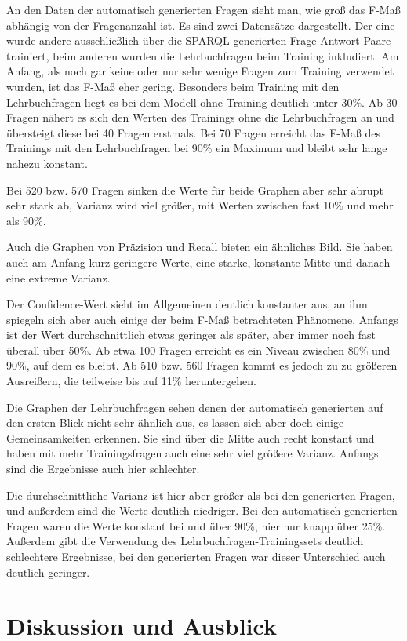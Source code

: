 \documentclass[utf8,biblatex]{lni}
\begin{document}
An den Daten der automatisch generierten Fragen sieht man, wie groß das F-Maß abhängig von der Fragenanzahl ist.
Es sind zwei Datensätze dargestellt.
Der eine wurde andere ausschließlich über die SPARQL-generierten Frage-Antwort-Paare trainiert, beim anderen wurden die Lehrbuchfragen beim Training inkludiert.
Am Anfang, als noch gar keine oder nur sehr wenige Fragen zum Training verwendet wurden, ist das F-Maß eher gering.
Besonders beim Training mit den Lehrbuchfragen liegt es bei dem Modell ohne Training deutlich unter 30\%.
Ab 30 Fragen nähert es sich den Werten des Trainings ohne die Lehrbuchfragen an und übersteigt diese bei 40 Fragen erstmals.
Bei 70 Fragen erreicht das F-Maß des Trainings mit den Lehrbuchfragen bei 90\% ein Maximum und bleibt sehr lange nahezu konstant.

Bei 520 bzw. 570 Fragen sinken die Werte für beide Graphen aber sehr abrupt sehr stark ab, Varianz wird viel größer,
mit Werten zwischen fast 10\% und mehr als 90\%.

Auch die Graphen von Präzision und Recall bieten ein ähnliches Bild.
Sie haben auch am Anfang kurz geringere Werte, eine starke, konstante Mitte und danach eine extreme Varianz.

Der Confidence-Wert sieht im Allgemeinen deutlich konstanter aus, an ihm spiegeln sich aber auch einige der beim F-Maß betrachteten Phänomene.
Anfangs ist der Wert durchschnittlich etwas geringer als später, aber immer noch fast überall über 50\%.
Ab etwa 100 Fragen erreicht es ein Niveau zwischen 80\% und 90\%, auf dem es bleibt.
Ab 510 bzw. 560 Fragen kommt es jedoch zu zu größeren Ausreißern, die teilweise bis auf 11\% heruntergehen.

Die Graphen der Lehrbuchfragen sehen denen der automatisch generierten auf den ersten Blick nicht sehr ähnlich aus,
es lassen sich aber doch einige Gemeinsamkeiten erkennen.
Sie sind über die Mitte auch recht konstant und haben mit mehr Trainingsfragen auch eine sehr viel größere Varianz.
Anfangs sind die Ergebnisse auch hier schlechter.

Die durchschnittliche Varianz ist hier aber größer als bei den generierten Fragen, und außerdem sind die Werte deutlich niedriger.
Bei den automatisch generierten Fragen waren die Werte konstant bei und über 90\%, hier nur knapp über 25\%.
Außerdem gibt die Verwendung des Lehrbuchfragen-Trainingssets deutlich schlechtere Ergebnisse, bei den generierten Fragen war dieser Unterschied auch deutlich geringer.

\section{Diskussion und Ausblick}
\end{document}
